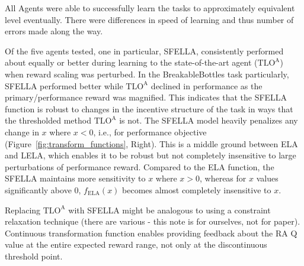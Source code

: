 


All Agents were able to successfully learn the tasks to approximately equivalent level eventually. There were differences in speed of learning and thus number of errors made along the way.

Of the five agents tested, one in particular, SFELLA, consistently performed about equally or better during learning to the state-of-the-art agent ($\text{TLO}^\text{A}$) when reward scaling was perturbed. In the BreakableBottles task particularly, SFELLA performed better while $\text{TLO}^\text{A}$ declined in performance as the primary/performance reward was magnified. This indicates that the SFELLA function is robust to changes in the incentive structure of the task in ways that the thresholded method $\text{TLO}^\text{A}$ is not. The SFELLA model heavily penalizes any change in $x$ where $x<0$, i.e., for performance objective (Figure~\ref{fig:transform_functions}, Right). This is a middle ground between ELA and LELA, which enables it to be robust but not completely insensitive to large perturbations of performance reward. Compared to the ELA function, the SFELLA maintains more sensitivity to $x$ where $x>0$, whereas for $x$ values significantly above 0, $f_{\text{ELA}}(x)$ becomes almost completely insensitive to $x$. 

Replacing $\text{TLO}^\text{A}$ with SFELLA might be analogous to using a constraint relaxation technique (there are various - this note is for ourselves, not for paper). Continuous transformation function enables providing feedback about the RA Q value at the entire expected reward range, not only at the discontinuous threshold point.

